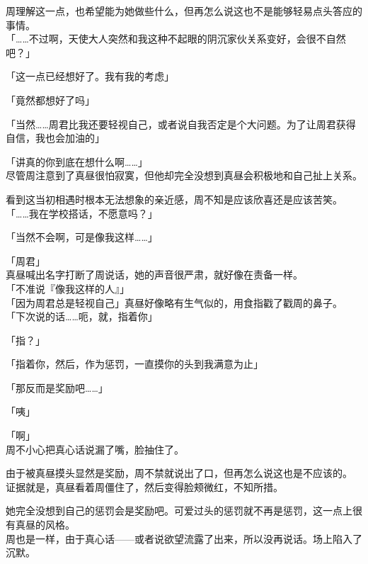 周理解这一点，也希望能为她做些什么，但再怎么说这也不是能够轻易点头答应的事情。\\

「……不过啊，天使大人突然和我这种不起眼的阴沉家伙关系变好，会很不自然吧？」

「这一点已经想好了。我有我的考虑」

「竟然都想好了吗」

「当然……周君比我还要轻视自己，或者说自我否定是个大问题。为了让周君获得自信，我也会加油的」

「讲真的你到底在想什么啊……」\\

尽管周注意到了真昼很怕寂寞，但他却完全没想到真昼会积极地和自己扯上关系。

看到这当初相遇时根本无法想象的亲近感，周不知是应该欣喜还是应该苦笑。\\

「……我在学校搭话，不愿意吗？」

「当然不会啊，可是像我这样……」

「周君」\\

真昼喊出名字打断了周说话，她的声音很严肃，就好像在责备一样。\\

「不准说『像我这样的人』」\\

「因为周君总是轻视自己」真昼好像略有生气似的，用食指戳了戳周的鼻子。\\

「下次说的话……呃，就，指着你」

「指？」

「指着你，然后，作为惩罚，一直摸你的头到我满意为止」

「那反而是奖励吧……」

「咦」

「啊」\\

周不小心把真心话说漏了嘴，脸抽住了。

由于被真昼摸头显然是奖励，周不禁就说出了口，但再怎么说这也是不应该的。\\

证据就是，真昼看着周僵住了，然后变得脸颊微红，不知所措。

她完全没想到自己的惩罚会是奖励吧。可爱过头的惩罚就不再是惩罚，这一点上很有真昼的风格。\\

周也是一样，由于真心话——或者说欲望流露了出来，所以没再说话。场上陷入了沉默。\\


